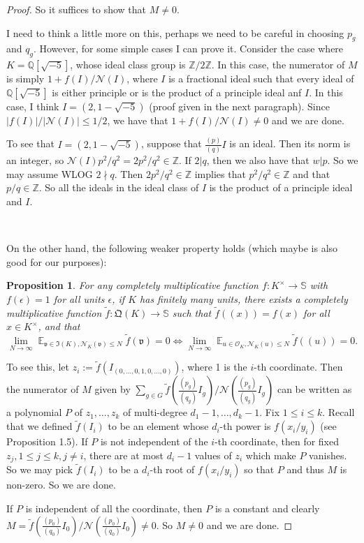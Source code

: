 \documentclass[11pt]{amsart}
\newtheorem{proposition}[lemma]{Proposition}
\theoremstyle{definition}
\DeclareMathOperator*{\E}{\mathbb{E}}
\newcommand{\NN}{{\mathcal N}}
\newcommand{\Q}{{\mathbb Q}}
\renewcommand{\S}{\mathbb{S}}
\newcommand{\Z}{{\mathbb Z}}
\newcommand{\e}{\epsilon}
\begin{document}
\begin{proof}
 So it suffices to show that $M\neq 0$. {\color{red} I need to think a little more on this, perhaps we need to be careful in choosing $p_{g}$ and $q_{g}$. However, for some simple cases I can prove it. Consider the case where $K=\Q[\sqrt{-5}]$, whose ideal class group is $\Z/2\Z$. In this case, the numerator of $M$ is simply $1+f(I)/\NN(I)$, where $I$ is a fractional ideal such that every ideal of $\Q[\sqrt{-5}]$ is either principle or is the product of a principle ideal anf $I$. In this case, I think $I=(2,1-\sqrt{-5})$ (proof given in the next paragraph). Since $\vert f(I)\vert/\vert\NN(I)\vert\leq 1/2$, we have that  $1+f(I)/\NN(I)\neq 0$ and we are done.
 
 To see that $I=(2,1-\sqrt{-5})$, suppose that $\frac{(p)}{(q)}I$ is an ideal. Then its norm is an integer, so $\NN(I)p^{2}/q^{2}=2p^{2}/q^{2}\in\Z$. If $2\vert q$, then we also have that $w\vert p$. So we may assume WLOG $2\nmid q$. Then $2p^{2}/q^{2}\in\Z$ implies that $p^{2}/q^{2}\in\Z$ and that $p/q\in\Z$. So all the ideals in the ideal class of $I$ is the product of a principle ideal and $I$.


 \


 On the other hand, the following weaker property holds (which maybe is also good for our purposes):
 
 \begin{proposition}
     For any completely multiplicative function $f\colon K^{\times}\to\S$ with  $f(\e)=1$ for all units $\e$, if $K$ has finitely many units, there exists a completely multiplicative function $\tilde{f}\colon \mathfrak{Q}(K)\to\S$ such that $\tilde{f}((x))=f(x)$ for all $x\in K^{\times}$, and that   $$\lim_{N\to\infty} \E_{\mathfrak{v}\in \mathfrak{I}(K), \NN_{K}(\mathfrak{v})\leq N}\tilde{f}(\mathfrak{v})=0 \Leftrightarrow \lim_{N\to\infty} \E_{u\in\mathcal{O}_{K}, \NN_{K}(u)\leq N}\tilde{f}((u))=0.$$
 \end{proposition}
   

 To see this, let $z_{i}:=\tilde{f}(I_{(0,\dots,0,1,0,\dots,0)})$, where 1 is the $i$-th coordinate. Then the numerator of $M$ given by $\sum_{g\in G}\tilde{f}(\frac{(p_{g})}{(q_{g})}I_{g})/\NN(\frac{(p_{g})}{(q_{g})}I_{g})$ can be written as a polynomial $P$ of $z_{1},\dots,z_{k}$ of multi-degree $d_{1}-1,\dots,d_{k}-1$.
 Fix $1\leq i\leq k$. Recall that we defined $\tilde{f}(I_{i})$ to be an element whose $d_{i}$-th power is $f(x_{i}/y_{i})$ (see Proposition 1.5).
 If $P$ is not independent of the $i$-th coordinate, then for fixed $z_{j}, 1\leq j\leq k, j\neq i$, there are at most $d_{i}-1$ values of $z_{i}$ which make $P$ vanishes. So we may pick  $\tilde{f}(I_{i})$ to be a $d_{i}$-th root of $f(x_{i}/y_{i})$ so that $P$ and thus $M$ is non-zero. So we are done.

 If  $P$ is  independent of all the coordinate, then $P$ is a constant and clearly
 $M=\tilde{f}(\frac{(p_{0})}{(q_{0})}I_{0})/\NN(\frac{(p_{0})}{(q_{0})}I_{0})\neq 0$. So $M\neq  0$ and we are done.
 }
\end{proof}
\end{document}
